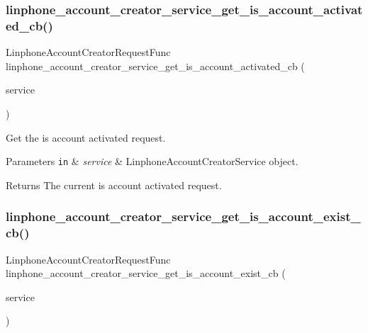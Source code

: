 \subsubsection{linphone\+\_\+account\+\_\+creator\+\_\+service\+\_\+get\+\_\+is\+\_\+account\+\_\+activated\+\_\+cb()}
{\footnotesize\ttfamily Linphone\+Account\+Creator\+Request\+Func linphone\+\_\+account\+\_\+creator\+\_\+service\+\_\+get\+\_\+is\+\_\+account\+\_\+activated\+\_\+cb (\begin{DoxyParamCaption}\item[{const \textbf{ Linphone\+Account\+Creator\+Service} $\ast$}]{service }\end{DoxyParamCaption})}



Get the is account activated request. 


\begin{DoxyParams}[1]{Parameters}
\mbox{\tt in}  & {\em service} & Linphone\+Account\+Creator\+Service object. \\
\hline
\end{DoxyParams}
\begin{DoxyReturn}{Returns}
The current is account activated request.  
\end{DoxyReturn}
\mbox{\label{group__account__creator__request_gab0ebab854c8784e417045ceaea4bd11c}} 
\subsubsection{linphone\+\_\+account\+\_\+creator\+\_\+service\+\_\+get\+\_\+is\+\_\+account\+\_\+exist\+\_\+cb()}
{\footnotesize\ttfamily Linphone\+Account\+Creator\+Request\+Func linphone\+\_\+account\+\_\+creator\+\_\+service\+\_\+get\+\_\+is\+\_\+account\+\_\+exist\+\_\+cb (\begin{DoxyParamCaption}\item[{const \textbf{ Linphone\+Account\+Creator\+Service} $\ast$}]{service }\end{DoxyParamCaption})}



